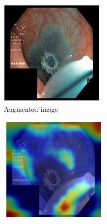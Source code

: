 \begin{figure}
     \centering
     \begin{subfigure}[t]{0.3\textwidth}
         \centering
         \includegraphics[width=\textwidth]{methodology/figures/sal4.png}
         \caption{Augmented image}
         \label{fig:sal4}
     \end{subfigure}
     \hfill
     \begin{subfigure}[t]{0.3\textwidth}
         \centering
         \includegraphics[width=\textwidth]{methodology/figures/sal5.png}

\end{subfigure}
\end{figure}
